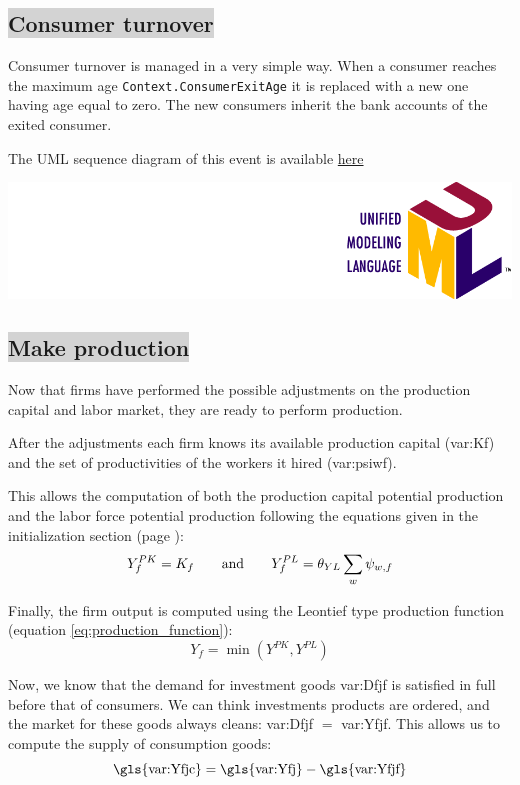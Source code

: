 \documentclass{book}
\newcommand{\doclocation}{file:///Users/giulioni/Documents/workspace/gabriele/docs}
\begin{document}
\subsection*{\colorbox{lightgray}{Consumer turnover}}

Consumer turnover is managed in a very simple way. When a consumer reaches the maximum age \verb+Context.ConsumerExitAge+ it is replaced with a new one having age equal to zero. The new consumers inherit the bank accounts of the exited consumer.

\vskip3mm
The UML sequence diagram of this event is available \href{\doclocation/umldoc/performConsumersTurnover.html}{here}
\begin{marginfigure}
	\includegraphics[scale=0.1]{uml.png}
\end{marginfigure}
\vskip3mm




\subsection*{\colorbox{lightgray}{Make production}}

Now that firms have performed the possible adjustments on the production capital and labor market, they are ready to perform production.  

After the adjustments each firm knows its available production capital (\gls{var:Kf}) and the set of productivities of the workers it hired (\gls{var:psiwf}).  

This allows the computation of both the production capital potential production and the labor force potential production following the equations given in the initialization section (page \pageref{pg:inputs1}):
\[
	Y^{PK}_f=K_f \qquad \textnormal{and} \qquad	Y^{PL}_f=\theta_{YL}\sum_{w}\psi_{w,f}
\]

Finally, the firm output is computed using the Leontief type production function (equation \ref{eq:production_function}):
\[
Y_f=\min(Y^{PK},Y^{PL})
\]

Now, we know that the demand for investment goods \gls{var:Dfjf} is satisfied in full before that of consumers. We can think investments products are ordered, and the market for these goods always cleans: \gls{var:Dfjf} $=$ \gls{var:Yfjf}. This allows us to compute the supply of consumption goods:
\[
	\textnormal{\gls{var:Yfjc}}=\textnormal{\gls{var:Yfj}}-\textnormal{\gls{var:Yfjf}}
\]
\end{document}
